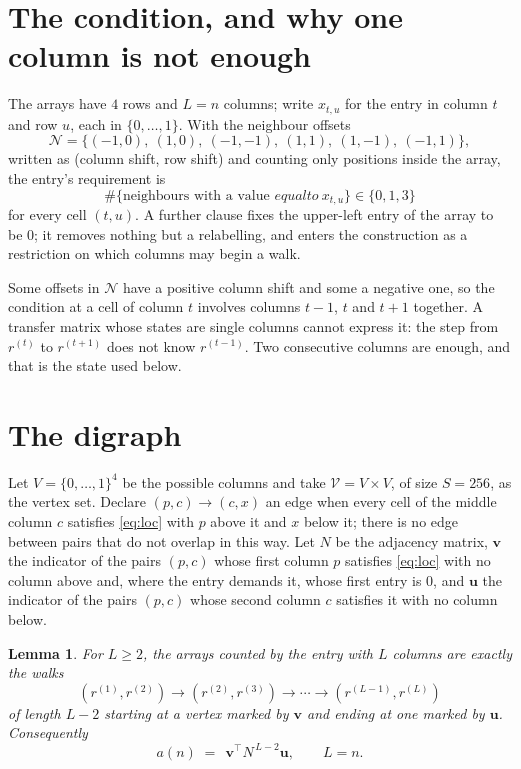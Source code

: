 \documentclass[11pt,a4paper]{article}
\theoremstyle{plain}
\newtheorem{lemma}[theorem]{Lemma}
\theoremstyle{definition}
\begin{document}
\section{The condition, and why one column is not enough}

The arrays have $4$ rows and $L=n$ columns; write $x_{t,u}$ for the entry in
column $t$ and row $u$, each in $\{0,\dots,1\}$. With the neighbour offsets
\[
\mathcal N=\{(-1,0),\ (1,0),\ (-1,-1),\ (1,1),\ (1,-1),\ (-1,1)\},
\]
written as (column shift, row shift) and counting only positions inside the array, the
entry's requirement is
\begin{equation}\label{eq:loc}
\#\{\text{neighbours with a value }equal to\ x_{t,u}\}\in\{0,1,3\}
\end{equation}
for every cell $(t,u)$. A further clause fixes the upper-left entry of the array to be $0$; it removes nothing but a relabelling, and enters the construction as a restriction on which columns may begin a walk.

Some offsets in $\mathcal N$ have a positive column shift and some a negative one, so the
condition at a cell of column $t$ involves columns $t-1$, $t$ and $t+1$ together. A transfer
matrix whose states are single columns cannot express it: the step from $r^{(t)}$ to
$r^{(t+1)}$ does not know $r^{(t-1)}$. Two consecutive columns are enough, and that is
the state used below.

\section{The digraph}

Let $V=\{0,\dots,1\}^{4}$ be the possible columns and take
$\mathcal V=V\times V$, of size $S=256$, as the vertex set. Declare $(p,c)\to(c,x)$ an edge
when every cell of the middle column $c$ satisfies \eqref{eq:loc} with $p$ above it and $x$
below it; there is no edge between pairs that do not overlap in this way. Let $N$ be the
adjacency matrix, $\mathbf{v}$ the indicator of the pairs $(p,c)$ whose first column $p$
satisfies \eqref{eq:loc} with no column above and, where the entry demands it, whose first entry is $0$, and $\mathbf{u}$ the indicator of
the pairs $(p,c)$ whose second column $c$ satisfies it with no column below.

\begin{lemma}\label{lem:walk}
For $L\ge2$, the arrays counted by the entry with $L$ columns are exactly the walks
\[
(r^{(1)},r^{(2)})\to(r^{(2)},r^{(3)})\to\cdots\to(r^{(L-1)},r^{(L)})
\]
of length $L-2$ starting at a vertex marked by $\mathbf{v}$ and ending at one marked by
$\mathbf{u}$. Consequently
\[
a(n)\;=\;\,\mathbf{v}^{\!\top}N^{\,L-2}\mathbf{u},\qquad L=n .
\]
\end{lemma}
\end{document}
